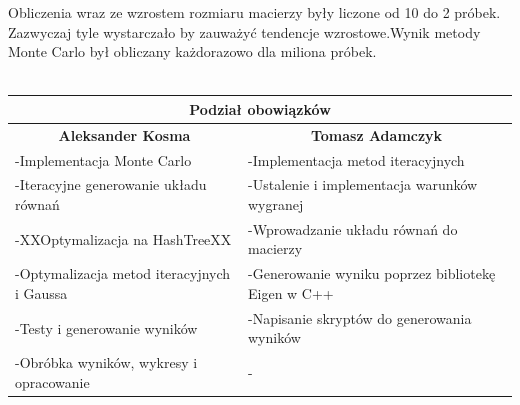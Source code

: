 \documentclass[8pt]{article}
\begin{document}
Obliczenia wraz ze wzrostem rozmiaru macierzy były liczone od 10 do 2 próbek. Zazwyczaj tyle wystarczało by zauważyć tendencje wzrostowe.Wynik metody Monte Carlo był obliczany każdorazowo dla miliona próbek.\\
\\
\begin{tabular}{ | p{8.2cm} | p{8.2cm} | }
  \hline
  \multicolumn{2}{|c|}{Podział obowiązków} \\
  \hline
  \multicolumn{1}{|c|}{\textbf{Aleksander Kosma} }& \multicolumn{1}{|c|}{\textbf{Tomasz Adamczyk}} \\
  \hline
  -Implementacja Monte Carlo & -Implementacja metod iteracyjnych \\\hline
   -Iteracyjne generowanie układu równań & -Ustalenie i implementacja warunków wygranej \\\hline
    -XXOptymalizacja na HashTreeXX & -Wprowadzanie układu równań do macierzy \\\hline
  -Optymalizacja metod iteracyjnych i Gaussa & -Generowanie wyniku poprzez bibliotekę Eigen w C++ \\\hline
  -Testy i generowanie wyników & -Napisanie skryptów do generowania wyników \\\hline
  -Obróbka wyników, wykresy i opracowanie & - \\\hline
  
  \hline
\end{tabular}
\end{document}
